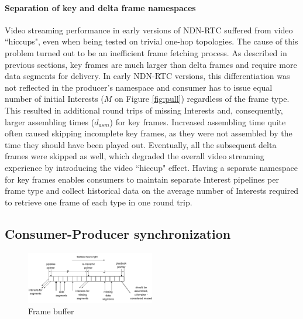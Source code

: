 \documentclass{icn/sig-alternate-2012} %
\newcommand{\ndnrtcName}{NDN-RTC} %
\begin{document}
\paragraph{Separation of key and delta frame namespaces} Video streaming performance in early versions of \ndnrtcName{} suffered from video ``hiccups", even when being tested on trivial one-hop topologies. The cause of this problem turned out to be an inefficient frame fetching process.
As described in previous sections, key frames are much larger than delta frames and require more data segments for delivery. In early \ndnrtcName{} versions, this differentiation was not reflected in the producer's namespace and consumer has to issue equal number of initial Interests ($M$ on Figure \ref{fig:pull}) regardless of the frame type. This resulted in additional round trips of missing Interests and, consequently, larger assembling times ($d_{asm}$) for key frames. Increased assembling time quite often caused skipping incomplete key frames, as they were not assembled by the time they should have been played out. Eventually, all the subsequent delta frames were skipped as well, which degraded the overall video streaming experience by introducing the video ``hiccup" effect. Having a separate namespace for key frames enables consumers to maintain separate Interest pipelines per frame type and collect historical data on the average number of Interests required to retrieve one frame of each type in one round trip.



\subsection{Consumer-Producer synchronization}

\begin{figure}[t!]
\centering
\includegraphics[width=0.5\textwidth]{buffer}
\caption{Frame buffer}
\label{fig:old-buf}
\end{figure}
\end{document}
